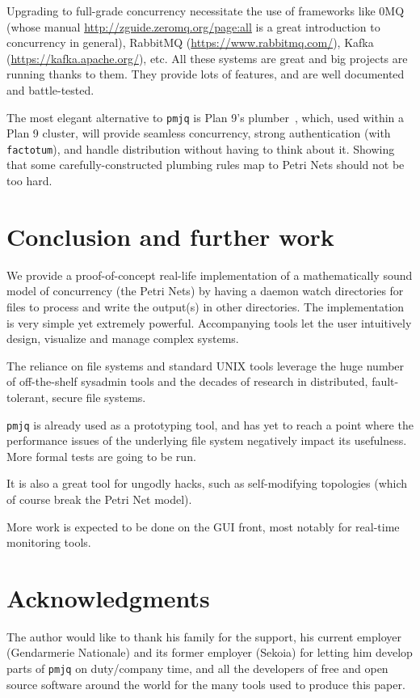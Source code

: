\documentclass[letterpaper,twocolumn,10pt]{article}
\begin{document}
Upgrading to full-grade concurrency necessitate the use of frameworks like 0MQ (whose manual \url{http://zguide.zeromq.org/page:all} is a great introduction to concurrency in general), RabbitMQ (\url{https://www.rabbitmq.com/}), Kafka (\url{https://kafka.apache.org/}), etc. All these systems are great and big projects are running thanks to them. They provide lots of features, and are well documented and battle-tested.

The most elegant alternative to {\tt pmjq} is Plan 9's plumber~\cite{plumber}, which, used within a Plan 9 cluster, will provide seamless concurrency, strong authentication (with {\tt factotum}), and handle distribution without having to think about it. Showing that some carefully-constructed plumbing rules map to Petri Nets should not be too hard.

\section{Conclusion and further work}
We provide a proof-of-concept real-life implementation of a mathematically sound model of concurrency (the Petri Nets) by having a daemon watch directories for files to process and write the output(s) in other directories. The implementation is very simple yet extremely powerful. Accompanying tools let the user intuitively design, visualize and manage complex systems.

The reliance on file systems and standard UNIX tools leverage the huge number of off-the-shelf sysadmin tools and the decades of research in distributed, fault-tolerant, secure file systems.

{\tt pmjq} is already used as a prototyping tool, and has yet to reach a point where the performance issues of the underlying file system negatively impact its usefulness. More formal tests are going to be run.

It is also a great tool for ungodly hacks, such as self-modifying topologies (which of course break the Petri Net model).

More work is expected to be done on the GUI front, most notably for real-time monitoring tools.

\section{Acknowledgments}

The author would like to thank his family for the support, his current employer (Gendarmerie Nationale) and its former employer (Sekoia) for letting him develop parts of {\tt pmjq} on duty/company time, and all the developers of free and open source software around the world for the many tools used to produce this paper.
\end{document}
